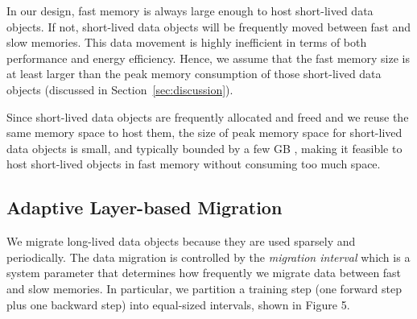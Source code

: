 In our design, fast memory is always large enough to host short-lived data objects. If not, short-lived data objects will be frequently moved between fast and slow memories. This data movement is highly inefficient in terms of both performance and energy efficiency. %
Hence, we assume that the fast memory size is at least larger than the peak memory consumption of those short-lived data objects (discussed in Section~\ref{sec:discussion}). 

Since short-lived data objects are frequently allocated and freed and we reuse the same memory space to host them, the size of peak memory space for short-lived data objects is small, and typically bounded by a few GB
\textcolor{check}{, making it feasible to host short-lived objects in fast memory without consuming too much space}. 

\vspace{-7pt}
\subsection{\textcolor{check}{Adaptive Layer-based Migration}}
\label{sec:adaptive_dm}


We migrate long-lived data objects 
\textcolor{check}{because they are used sparsely and periodically}. %
The data migration is controlled by the \textit{migration interval} \textcolor{check}{which is a system parameter that} determines how frequently we migrate data between fast and slow memories. %
\textcolor{check}{In particular, we partition a training step (one forward step plus one backward step) into equal-sized intervals, shown in Figure 5.}

